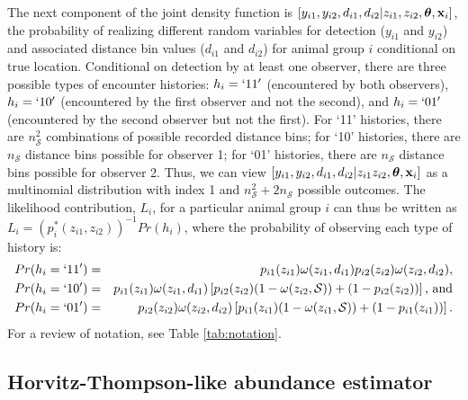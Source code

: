 \documentclass[aoas,preprint]{imsart}
\numberwithin{equation}{section}
\theoremstyle{plain}
\begin{document}
The next component of the joint density function is $[{ y}_{i1},{ y}_{i2},{ d}_{i 1},{ d}_{i 2}|{ z}_{i 1},{ z}_{i 2}, \boldsymbol{\theta} , {\bf x}_i]$, the probability of realizing different random variables for detection ($y_{i1}$ and $y_{i2}$) and associated  distance bin values ($d_{i1}$ and $d_{i2}$) for animal group $i$ conditional on true location.  Conditional on detection by at least one observer, there are three possible types of encounter histories: $h_i = `11'$ (encountered by both observers), $h_i = `10'$ (encountered by the first observer and not the second), and $h_i = `01'$ (encountered by the second observer but not the first).  For `11' histories, there are $n_\mathcal{S}^2$ combinations of possible recorded distance bins; for `10' histories, there are $n_\mathcal{S}$ distance bins possible for observer 1; for `01' histories, there are $n_\mathcal{S}$ distance bins possible for observer 2.  Thus, we can view $[{ y}_{i1},{ y}_{i2},{ d}_{i 1},{ d}_{i 2}|{ z}_{i 1} { z}_{i 2}, \boldsymbol{\theta} , {\bf x}_i]$ as a multinomial distribution with index 1 and $n_\mathcal{S}^2 + 2 n_\mathcal{S}$ possible outcomes. The likelihood contribution, $L_i$, for a particular animal group $i$ can thus be written as $L_i = (p_i^*(z_{i1},z_{i2}))^{-1} Pr(h_i)$, where the probability of observing each type of history is:
\begin{eqnarray*}
   Pr(h_i = `11') & = &  p_{i1}(z_{i1}) \omega(z_{i1},d_{i1}) p_{i2}(z_{i2}) \omega(z_{i2},d_{i2}), \\
   Pr(h_i = `10') & = & p_{i1}(z_{i1})\omega(z_{i1},d_{i1}) \left[
    p_{i2}(z_{i2})(1-\omega(z_{i2},\mathcal{S}))+(1-p_{i2}(z_{i2})) \right] \text{, and} \\
   Pr(h_i = `01') & = & p_{i2}(z_{i2})\omega(z_{i2},d_{i2}) \left[
    p_{i1}(z_{i1})(1-\omega(z_{i1},\mathcal{S}))+(1-p_{i1}(z_{i1})) \right].
\end{eqnarray*}
For a review of notation, see Table \ref{tab:notation}.

\subsection{Horvitz-Thompson-like abundance estimator}
\end{document}
